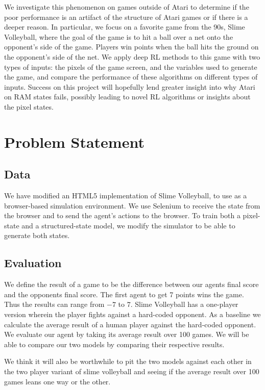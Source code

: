 \documentclass[10pt,twocolumn,letterpaper]{article}
\begin{document}
We investigate this phenomenon on games outside of Atari to determine
if the poor performance is an artifact of the structure of Atari games or if
there is a deeper reason. In particular, we focus on a favorite game from the
90s, Slime Volleyball, where the goal of the game is to hit a ball over a net
onto the opponent's side of the game. Players win points when the ball hits the
ground on the opponent's side of the net. We apply deep RL methods to
this game with two types of inputs: the pixels of the game screen, and the
variables used to generate the game, and compare the performance of these
algorithms on different types of inputs. Success on this project will hopefully
lend greater insight into why Atari on RAM states fails, possibly leading to
novel RL algorithms or insights about the pixel states.

\section{Problem Statement}
\subsection{Data}

We have modified an HTML5 implementation of Slime Volleyball, to use
as a browser-based simulation environment. We use Selenium to receive the
state from the browser and to send the agent's actions to the browser. To train
both a pixel-state and a structured-state model, we modify the simulator to be
able to generate both states.

\subsection{Evaluation}

We define the result of a game to be the difference between our agents final score
and the opponents final score. The first agent to get 7 points wins the game.
Thus the results can range from $-7$ to $7$. Slime Volleyball has a one-player
version wherein the player fights against a hard-coded opponent. As a baseline
we calculate the average result of a human player against the hard-coded opponent. \\

\noindent We evaluate our agent by taking its average result over 100
games. We will be able to compare our two models by comparing their respective
results.

\noindent We think it will also be worthwhile to pit the two models against each
other in the two player variant of slime volleyball and seeing if the average
result over 100 games leans one way or the other.
\end{document}
